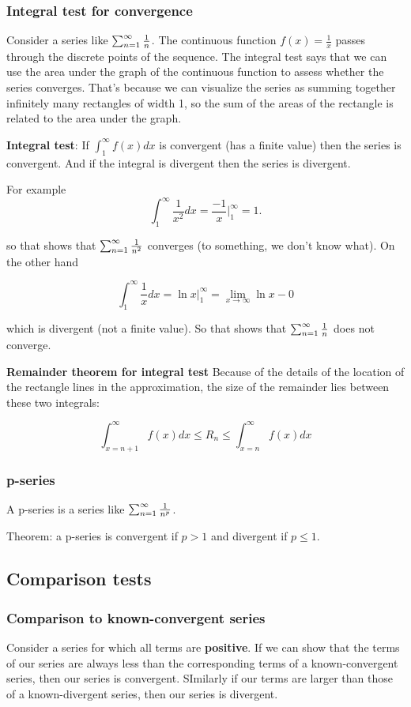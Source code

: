 \subsubsection{Integral test for convergence}
Consider a series like $\sum_{n=1}^{\infty} \frac{1}{n}$. The continuous function $f(x) = \frac{1}{x}$ passes through the discrete points of the sequence. The integral test says that we can use the area under the graph of the continuous function to assess whether the series converges. That's because we can visualize the series as summing together infinitely many rectangles of width 1, so the sum of the areas of the rectangle is related to the area under the graph.

\textbf{Integral test}: If $\int_1^\infty f(x) dx$ is convergent (has a finite value) then the series is convergent. And if the integral is divergent then the series is divergent.

For example
$$
\int_1^\infty \frac{1}{x^2} dx = \frac{-1}{x} \Big|_1^\infty = 1.
$$

so that shows that $\sum_{n=1}^{\infty} \frac{1}{n^2}$ converges (to something, we don't know what). On the other hand

$$
\int_1^\infty \frac{1}{x} dx = \ln x \Big|_1^\infty = \lim_{x \to \infty} \ln x - 0
$$

which is divergent (not a finite value). So that shows that $\sum_{n=1}^{\infty} \frac{1}{n}$ does not converge.

\textbf{Remainder theorem for integral test}
Because of the details of the location of the rectangle lines in the approximation, the size of the remainder lies between these two integrals:

$$
\int_{x=n+1}^\infty f(x) dx \leq R_n \leq \int_{x=n}^\infty f(x) dx
$$


\subsubsection{p-series}

A p-series is a series like $\sum_{n=1}^{\infty} \frac{1}{n^p}$.

Theorem: a p-series is convergent if $p>1$ and divergent if $p \leq 1$.

\subsection{Comparison tests}

\subsubsection{Comparison to known-convergent series}
Consider a series for which all terms are \textbf{positive}. If we can show that the terms of our series are always less than the corresponding terms of a known-convergent series, then our series is convergent. SImilarly if our terms are larger than those of a known-divergent series, then our series is divergent.

